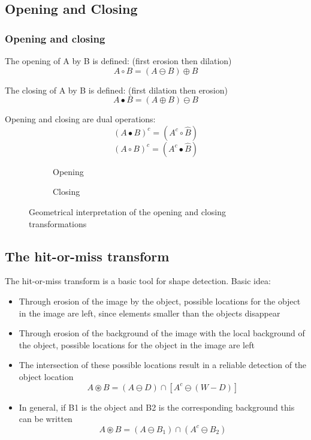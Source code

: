 \subsection{Opening and Closing}
\subsubsection{Opening and closing}
The opening of A by B is defined: (first erosion then dilation)
\[
	A \circ B = (A \ominus B) \oplus B
\]

The closing of A by B is defined: (first dilation then erosion)
\[
	A  \bullet B = (A \oplus B) \ominus B
\]

Opening and closing are dual operations: 
\[
	(A  \bullet B)^c = (A^c \circ \hat{B})
\]
\[
	(A \circ B)^c = (A^c \bullet \hat{B})
\]

\begin{figure}[h!]
	\centering
	\begin{subfigure}[b]{0.45\textwidth}
		\centering
		\caption{Opening}
	\end{subfigure}
	\begin{subfigure}[b]{0.45\textwidth}
		\centering
		\caption{Closing}
	\end{subfigure}
	\caption{Geometrical interpretation of the opening and closing transformations}
\end{figure}


\subsection{The hit-or-miss transform}
The hit-or-miss transform is a basic tool for shape detection. Basic idea:
\begin{itemize}
	\item Through erosion of the image by the object, possible locations for the object in the image are left, since elements smaller than the objects disappear
	
	\item Through erosion of the background of the image with the local background of the object, possible locations for the object in the image are left
	
	\item The intersection of these possible locations result in a reliable  detection of the object location
	\[
		A \circledast B = (A \ominus D) \cap [ A^c \ominus (W-D)]
	\]
	
	\item In general, if B1 is the object and B2 is the corresponding background this can be written
	\[
		A \circledast B = (A \ominus B_1)\cap (A^c \ominus B_2)	
	\]	
\end{itemize}


